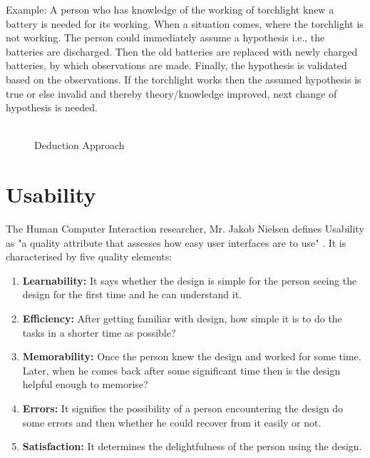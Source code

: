 Example: A person who has knowledge of the working of torchlight knew a battery is needed for its working. When a situation comes, where the torchlight is not working. The person could immediately assume a hypothesis i.e., the batteries are discharged. Then the old batteries are replaced with newly charged batteries, by which observations are made. Finally, the hypothesis is validated based on the observations. If the torchlight works then the assumed hypothesis is true or else invalid and thereby theory/knowledge improved, next change of hypothesis is needed. \\ \\

\begin{figure}
	\centering
	
	
	\caption{Deduction Approach}
	\label{fig:DA}
\end{figure} 


\section{Usability}

The Human Computer Interaction researcher, Mr. Jakob Nielsen defines Usability as "a quality attribute that assesses how easy user interfaces are to use" \cite{usability-define}. It is characterised by five quality elements:

\begin{enumerate}
\item \textbf{Learnability:}  It says whether the design is simple for the person seeing the design for the first time and he can understand it.
\item \textbf{Efficiency:}  After getting familiar with design, how simple it is to do the tasks in a shorter time as possible?
\item \textbf{Memorability:} Once the person knew the design and worked for some time. Later, when he comes back after some significant time then is the design helpful enough to memorise?
\item \textbf{Errors:} It signifies the possibility of a person encountering the design do some errors and then whether he could recover from it easily or not.
\item \textbf{Satisfaction:} It determines the delightfulness of the person using the design.
\end{enumerate}

